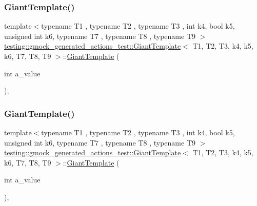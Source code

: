 \subsubsection{\texorpdfstring{GiantTemplate()}{GiantTemplate()}\hspace{0.1cm}{\footnotesize\ttfamily [1/3]}}
{\footnotesize\ttfamily template$<$typename T1 , typename T2 , typename T3 , int k4, bool k5, unsigned int k6, typename T7 , typename T8 , typename T9 $>$ \\
\mbox{\hyperlink{structtesting_1_1gmock__generated__actions__test_1_1_giant_template}{testing\+::gmock\+\_\+generated\+\_\+actions\+\_\+test\+::\+Giant\+Template}}$<$ T1, T2, T3, k4, k5, k6, T7, T8, T9 $>$\+::\mbox{\hyperlink{structtesting_1_1gmock__generated__actions__test_1_1_giant_template}{Giant\+Template}} (\begin{DoxyParamCaption}\item[{int}]{a\+\_\+value }\end{DoxyParamCaption})\hspace{0.3cm}{\ttfamily [inline]}, {\ttfamily [explicit]}}

\mbox{\label{structtesting_1_1gmock__generated__actions__test_1_1_giant_template_aaa836b162de31fbd538ffcbed448f430}} 
\subsubsection{\texorpdfstring{GiantTemplate()}{GiantTemplate()}\hspace{0.1cm}{\footnotesize\ttfamily [2/3]}}
{\footnotesize\ttfamily template$<$typename T1 , typename T2 , typename T3 , int k4, bool k5, unsigned int k6, typename T7 , typename T8 , typename T9 $>$ \\
\mbox{\hyperlink{structtesting_1_1gmock__generated__actions__test_1_1_giant_template}{testing\+::gmock\+\_\+generated\+\_\+actions\+\_\+test\+::\+Giant\+Template}}$<$ T1, T2, T3, k4, k5, k6, T7, T8, T9 $>$\+::\mbox{\hyperlink{structtesting_1_1gmock__generated__actions__test_1_1_giant_template}{Giant\+Template}} (\begin{DoxyParamCaption}\item[{int}]{a\+\_\+value }\end{DoxyParamCaption})\hspace{0.3cm}{\ttfamily [inline]}, {\ttfamily [explicit]}}

